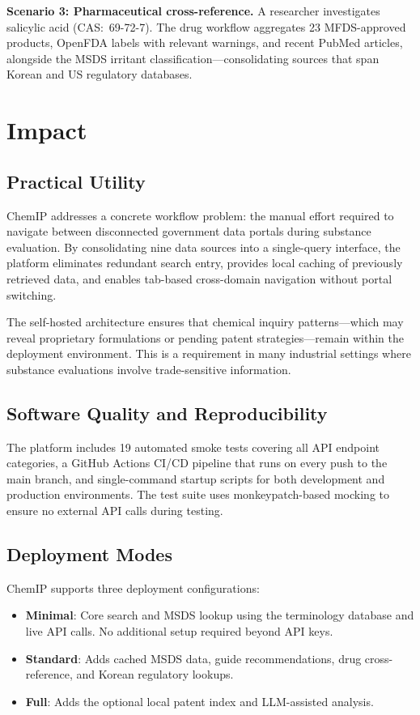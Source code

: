 \documentclass[preprint,12pt]{elsarticle}
\begin{document}
\textbf{Scenario 3: Pharmaceutical cross-reference.}
A researcher investigates salicylic acid (CAS:~69-72-7).
The drug workflow aggregates 23 MFDS-approved products, OpenFDA labels with relevant warnings, and recent PubMed articles, alongside the MSDS irritant classification---consolidating sources that span Korean and US regulatory databases.

\section{Impact}
\label{sec:impact}

\subsection{Practical Utility}

ChemIP addresses a concrete workflow problem: the manual effort required to navigate between disconnected government data portals during substance evaluation.
By consolidating nine data sources into a single-query interface, the platform eliminates redundant search entry, provides local caching of previously retrieved data, and enables tab-based cross-domain navigation without portal switching.

The self-hosted architecture ensures that chemical inquiry patterns---which may reveal proprietary formulations or pending patent strategies---remain within the deployment environment.
This is a requirement in many industrial settings where substance evaluations involve trade-sensitive information.

\subsection{Software Quality and Reproducibility}

The platform includes 19 automated smoke tests covering all API endpoint categories, a GitHub Actions CI/CD pipeline that runs on every push to the main branch, and single-command startup scripts for both development and production environments.
The test suite uses monkeypatch-based mocking to ensure no external API calls during testing.

\subsection{Deployment Modes}

ChemIP supports three deployment configurations:
\begin{itemize}
  \item \textbf{Minimal}: Core search and MSDS lookup using the terminology database and live API calls. No additional setup required beyond API keys.
  \item \textbf{Standard}: Adds cached MSDS data, guide recommendations, drug cross-reference, and Korean regulatory lookups.
  \item \textbf{Full}: Adds the optional local patent index and LLM-assisted analysis.
\end{itemize}
\end{document}
